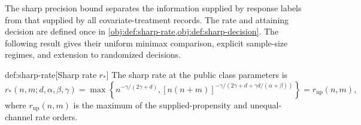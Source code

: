\documentclass[11pt]{article}
\begin{document}
The sharp precision bound separates the information supplied by response labels from that supplied by all covariate-treatment records. The rate and attaining decision are defined once in \cref{obj:def:sharp-rate,obj:def:sharp-decision}. The following result gives their uniform minimax comparison, explicit sample-size regimes, and extension to randomized decisions.

\begin{definitionv}{def:sharp-rate}[Sharp rate \(r_*\)]
The sharp rate at the public class parameters is
\[
r_*(n,m;d,\alpha,\beta,\gamma)
=
\max\left\{
n^{-\gamma/(2\gamma+d)},
[n(n+m)]^{-\gamma/(2\gamma+d+\gamma d/(\alpha+\beta))}
\right\}
=
r_{\mathrm{up}}(n,m),
\]
where \(r_{\mathrm{up}}(n,m)\) is the maximum of the supplied-propensity and unequal-channel rate orders.
\end{definitionv}
\end{document}
